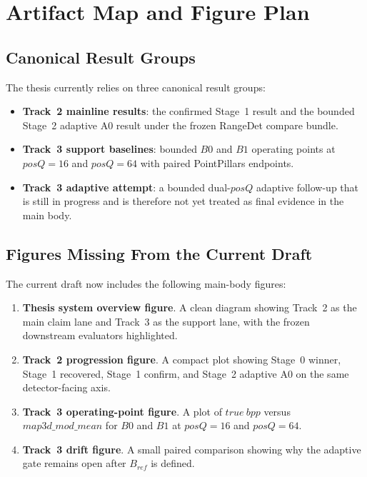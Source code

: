 \section{Artifact Map and Figure Plan}\label{apx:artifacts}

\subsection{Canonical Result Groups}
The thesis currently relies on three canonical result groups:

\begin{itemize}
\item \textbf{Track~2 mainline results}: the confirmed Stage~1 result and the bounded Stage~2 adaptive A0 result under the frozen RangeDet compare bundle.
\item \textbf{Track~3 support baselines}: bounded \(B0\) and \(B1\) operating points at \(posQ=16\) and \(posQ=64\) with paired PointPillars endpoints.
\item \textbf{Track~3 adaptive attempt}: a bounded dual-\(posQ\) adaptive follow-up that is still in progress and is therefore not yet treated as final evidence in the main body.
\end{itemize}

\subsection{Figures Missing From the Current Draft}
The current draft now includes the following main-body figures:

\begin{enumerate}
\item \textbf{Thesis system overview figure}. A clean diagram showing Track~2 as the main claim lane and Track~3 as the support lane, with the frozen downstream evaluators highlighted.
\item \textbf{Track~2 progression figure}. A compact plot showing Stage~0 winner, Stage~1 recovered, Stage~1 confirm, and Stage~2 adaptive A0 on the same detector-facing axis.
\item \textbf{Track~3 operating-point figure}. A plot of \(true\ bpp\) versus \(map3d\_mod\_mean\) for \(B0\) and \(B1\) at \(posQ=16\) and \(posQ=64\).
\item \textbf{Track~3 drift figure}. A small paired comparison showing why the adaptive gate remains open after \(B_{ref}\) is defined.
\end{enumerate}


